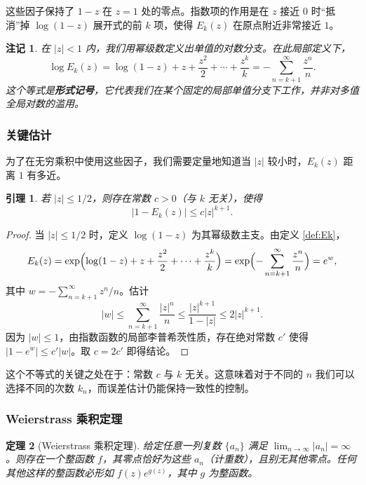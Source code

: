 \documentclass[UTF8]{ctexart}
\newtheorem{theorem}{定理}[section]
\newtheorem{lemma}[theorem]{引理}
\newtheorem{remark}{注记}[section]
\numberwithin{equation}{section}
\begin{document}
这些因子保持了 \(1 - z\) 在 \(z = 1\) 处的零点。指数项的作用是在 \(z\) 接近 \(0\) 时“抵消”掉 \(\log(1 - z)\) 展开式的前 \(k\) 项，使得 \(E_k(z)\) 在原点附近非常接近 \(1\)。

\begin{remark}
在 \(|z| < 1\) 内，我们用幂级数定义出单值的对数分支。在此局部定义下，
\[
\log E_k(z) = \log(1-z) + z + \frac{z^2}{2} + \cdots + \frac{z^k}{k} = -\sum_{n=k+1}^\infty \frac{z^n}{n}.
\]
这个等式是\textbf{形式记号}，它代表我们在某个固定的局部单值分支下工作，并非对多值全局对数的滥用。
\end{remark}

\subsubsection{关键估计}

为了在无穷乘积中使用这些因子，我们需要定量地知道当 \(|z|\) 较小时，\(E_k(z)\) 距离 \(1\) 有多近。

\begin{lemma}\label{lem:Ek-est}
若 \(|z| \le 1/2\)，则存在常数 \(c > 0\)（与 \(k\) 无关），使得
\begin{equation}
|1 - E_k(z)| \le c |z|^{k+1}.
\end{equation}
\end{lemma}

\begin{proof}
当 \(|z| \le 1/2\) 时，定义 \(\log(1 - z)\) 为其幂级数主支。由定义 \ref{def:Ek}，
\[
E_k(z) = \exp\Bigl( \log(1 - z) + z + \frac{z^2}{2} + \dots + \frac{z^k}{k} \Bigr)
= \exp\Bigl( -\sum_{n=k+1}^\infty \frac{z^n}{n} \Bigr) = e^w,
\]
其中 \(w = -\sum_{n=k+1}^\infty z^n/n\)。估计
\[
|w| \le \sum_{n=k+1}^\infty \frac{|z|^n}{n} \le \frac{|z|^{k+1}}{1 - |z|} \le 2|z|^{k+1}.
\]
因为 \(|w| \le 1\)，由指数函数的局部李普希茨性质，存在绝对常数 \(c'\) 使得 \(|1 - e^w| \le c' |w|\)。取 \(c = 2c'\) 即得结论。
\end{proof}

这个不等式的关键之处在于：常数 \(c\) 与 \(k\) 无关。这意味着对于不同的 \(n\) 我们可以选择不同的次数 \(k_n\)，而误差估计仍能保持一致性的控制。

\subsubsection{Weierstrass 乘积定理}

\begin{theorem}[Weierstrass 乘积定理]\label{thm:weierstrass}
给定任意一列复数 \(\{a_n\}\) 满足 \(\lim_{n \to \infty} |a_n| = \infty\)。则存在一个整函数 \(f\)，其零点恰好为这些 \(a_n\)（计重数），且别无其他零点。任何其他这样的整函数必形如 \(f(z) e^{g(z)}\)，其中 \(g\) 为整函数。
\end{theorem}
\end{document}
